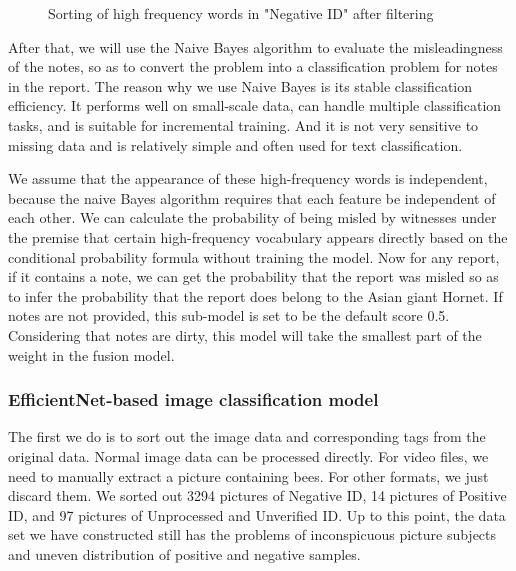 \documentclass{mcmthesis}
\numberwithin{figure}{section}
\numberwithin{table}{section}
\begin{document}
\begin{figure}[H]
  \caption{Sorting of high frequency words in "Negative ID" after filtering}\label{sohfwaf}
\end{figure}

After that, we will use the Naive Bayes algorithm to evaluate the misleadingness of the notes, so as to convert the problem into a classification problem for notes in the report. The reason why we use Naive Bayes is its stable classification efficiency. It performs well on small-scale data, can handle multiple classification tasks, and is suitable for incremental training. And it is not very sensitive to missing data and is relatively simple and often used for text classification.

We assume that the appearance of these high-frequency words is independent, because the naive Bayes algorithm requires that each feature be independent of each other. We can calculate the probability of being misled by witnesses under the premise that certain high-frequency vocabulary appears directly based on the conditional probability formula without training the model. Now for any report, if it contains a note, we can get the probability that the report was misled so as to infer the probability that the report does belong to the Asian giant Hornet. If notes are not provided,  this sub-model is set to be the default score 0.5. Considering that notes are dirty, this model will take the smallest part of the weight in the fusion model.

\subsubsection{EfficientNet-based image classification model}

The first we do is to sort out the image data and corresponding tags from the original data. Normal image data can be processed directly. For video files, we need to manually extract a picture containing bees. For other formats, we just discard them. We sorted out 3294 pictures of Negative ID, 14 pictures of Positive ID, and 97 pictures of Unprocessed and Unverified ID. Up to this point, the data set we have constructed still has the problems of inconspicuous picture subjects and uneven distribution of positive and negative samples.
\end{document}
